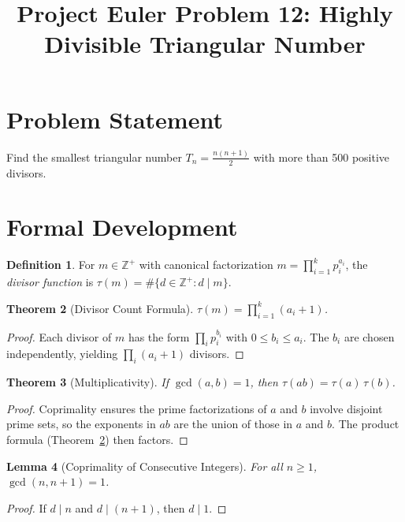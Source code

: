 \documentclass[12pt]{article}
\title{Project Euler Problem 12: Highly Divisible Triangular Number}
\author{}
\date{}
\newtheorem{theorem}{Theorem}
\newtheorem{lemma}[theorem]{Lemma}
\theoremstyle{definition}
\newtheorem{definition}[theorem]{Definition}
\theoremstyle{remark}
\begin{document}
\maketitle

\section{Problem Statement}

Find the smallest triangular number $T_n = \frac{n(n+1)}{2}$ with more than 500 positive divisors.

\section{Formal Development}

\begin{definition}
For $m \in \mathbb{Z}^+$ with canonical factorization $m = \prod_{i=1}^{k} p_i^{a_i}$, the \emph{divisor function} is $\tau(m) = \#\{d \in \mathbb{Z}^+ : d \mid m\}$.
\end{definition}

\begin{theorem}[Divisor Count Formula]
\label{thm:tau}
$\tau(m) = \prod_{i=1}^{k}(a_i + 1)$.
\end{theorem}

\begin{proof}
Each divisor of $m$ has the form $\prod_i p_i^{b_i}$ with $0 \le b_i \le a_i$. The $b_i$ are chosen independently, yielding $\prod_i (a_i+1)$ divisors.
\end{proof}

\begin{theorem}[Multiplicativity]
\label{thm:mult}
If $\gcd(a,b) = 1$, then $\tau(ab) = \tau(a)\,\tau(b)$.
\end{theorem}

\begin{proof}
Coprimality ensures the prime factorizations of $a$ and $b$ involve disjoint prime sets, so the exponents in $ab$ are the union of those in $a$ and $b$. The product formula (Theorem~\ref{thm:tau}) then factors.
\end{proof}

\begin{lemma}[Coprimality of Consecutive Integers]
\label{lem:consec}
For all $n \ge 1$, $\gcd(n, n+1) = 1$.
\end{lemma}

\begin{proof}
If $d \mid n$ and $d \mid (n+1)$, then $d \mid 1$.
\end{proof}
\end{document}
